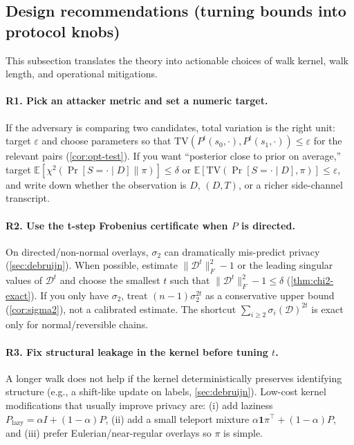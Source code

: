 \documentclass[11pt]{article}
\newcommand{\TV}{\mathrm{TV}}
\newcommand{\E}{\mathbb{E}}
\newcommand{\cD}{\mathcal{D}}
\begin{document}
\subsection*{Design recommendations (turning bounds into protocol knobs)}
This subsection translates the theory into actionable choices of walk kernel,
walk length, and operational mitigations.

\paragraph{R1. Pick an attacker metric and set a numeric target.}
If the adversary is comparing two candidates, total variation is the right unit:
target $\varepsilon$ and choose parameters so that
$\TV(P^t(s_0,\cdot),P^t(s_1,\cdot))\le \varepsilon$ for the relevant pairs
(\cref{cor:opt-test}). If you want ``posterior close to prior on average,''
target $\E[\chi^2(\Pr[S=\cdot\mid D]\|\pi)]\le \delta$ or
$\E[\TV(\Pr[S=\cdot\mid D],\pi)]\le \varepsilon$, and write down whether
the observation is $D$, $(D,T)$, or a richer side-channel transcript.

\paragraph{R2. Use the t-step Frobenius certificate when $P$ is directed.}
On directed/non-normal overlays, $\sigma_2$ can dramatically mis-predict privacy
(\cref{sec:debruijn}). When possible, estimate $\|\cD^t\|_F^2-1$ or the leading
singular values of $\cD^t$ and choose the smallest $t$ such that
$\|\cD^t\|_F^2-1\le \delta$ (\cref{thm:chi2-exact}). If you only have
$\sigma_2$, treat $(n-1)\sigma_2^{2t}$ as a conservative upper bound (\cref{cor:sigma2}),
not a calibrated estimate.  The shortcut $\sum_{i\ge2} \sigma_i(\cD)^{2t}$ is exact only for normal/reversible chains.

\paragraph{R3. Fix structural leakage in the kernel before tuning $t$.}
A longer walk does not help if the kernel deterministically preserves identifying
structure (e.g., a shift-like update on labels, \cref{sec:debruijn}). Low-cost
kernel modifications that usually improve privacy are:
(i) add laziness $P_{\text{lazy}}=\alpha I+(1-\alpha)P$,
(ii) add a small teleport mixture $\alpha \mathbf{1}\pi^\top+(1-\alpha)P$,
and (iii) prefer Eulerian/near-regular overlays so $\pi$ is simple.
\end{document}
